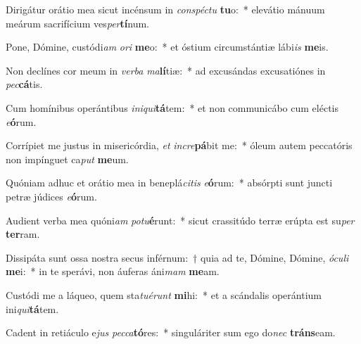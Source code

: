 \item Dirigátur orátio mea sicut incénsum in \textit{con}\textit{spéc}\textit{tu} \textbf{tu}o:~* elevátio mánuum meárum sacrifícium ves\textit{per}\textbf{tí}num.
\item Pone, Dómine, custódi\textit{am} \textit{o}\textit{ri} \textbf{me}o:~* et óstium circumstántiæ lábi\textit{is} \textbf{me}is.
\item Non declínes cor meum in \textit{ver}\textit{ba} \textit{ma}\textbf{lí}tiæ:~* ad excusándas excusatiónes in \textit{pec}\textbf{cá}tis.
\item Cum homínibus operántibus \textit{in}\textit{i}\textit{qui}\textbf{tá}tem:~* et non communicábo cum eléctis \textit{e}\textbf{ó}rum.
\item Corrípiet me justus in misericórdia, \textit{et} \textit{in}\textit{cre}\textbf{pá}bit me:~* óleum autem peccatóris non impínguet ca\textit{put} \textbf{me}um.
\item Quóniam adhuc et orátio mea in beneplá\textit{ci}\textit{tis} \textit{e}\textbf{ó}rum:~* absórpti sunt juncti petræ júdices \textit{e}\textbf{ó}rum.
\item Audient verba mea quóni\textit{am} \textit{pot}\textit{u}\textbf{é}runt:~* sicut crassitúdo terræ erúpta est su\textit{per} \textbf{ter}ram.
\item Dissipáta sunt ossa nostra secus inférnum:~† quia ad te, Dómine, Dómine, \textit{ó}\textit{cu}\textit{li} \textbf{me}i:~* in te sperávi, non áuferas áni\textit{mam} \textbf{me}am.
\item Custódi me a láqueo, quem sta\textit{tu}\textit{é}\textit{runt} \textbf{mi}hi:~* et a scándalis operántium ini\textit{qui}\textbf{tá}tem.
\item Cadent in retiáculo e\textit{jus} \textit{pec}\textit{ca}\textbf{tó}res:~* singuláriter sum ego do\textit{nec} \textbf{tráns}eam.
